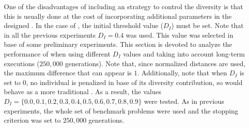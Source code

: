 One of the disadvantages of including an strategy to control the diversity is that this is usually done at the cost of
incorporating additional parameters in the designed \EA{}.
%
In the case of \VSDMOEA{}, the initial threshold value ($D_I$) must be set.
%
Note that in all the previous experiments $D_I = 0.4$ was used.
%
This value was selected in base of some preliminary experiments.
%
This section is devoted to analyze the performance of \VSDMOEA{} when using different $D_I$ values and taking into account long-term executions ($250,000$ generations).
%
Note that, since normalized distances are used, the maximum difference that can appear is $1$.
%
Additionally, note that when $D_I$ is set to 0, no individual is penalized in base of its diversity contribution,
so \VSDMOEA{} would behave as a more traditional \MOEA{}.
%
As a result, the values $D_I = \{0.0, 0.1, 0.2, 0.3, 0.4, 0.5, 0.6, 0.7, 0.8, 0.9\}$ were tested.
%
As in previous experiments, the whole set of benchmark problems were used and
the stopping criterion was set to $250,000$ generations.

